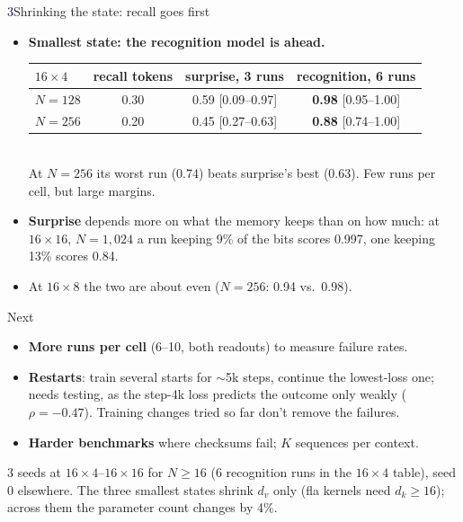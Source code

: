 \documentclass{article}
\renewcommand{\small}{\fontsize{25}{32}\selectfont}
\renewcommand{\footnotesize}{\fontsize{22}{28}\selectfont}
\newcommand{\RC}[1]{\textcolor{recall}{\textbf{#1}}}
\newcommand{\RG}[1]{\textcolor{recog}{\textbf{#1}}}
\begin{document}
\begin{minipage}[t]{15.3in}
\begin{block}[colframe=navy,boxrule=5pt]{\textcolor{navy}{3}\enspace Shrinking the state: recall goes first}
\begin{itemize}
    \item \textbf{Smallest state: the recognition model is ahead.} \\[0.1em]
          {\small\begin{tabular}{@{}lccc@{}}
            $16{\times}4$ & recall tokens & \RC{surprise}, 3 runs & \RG{recognition}, 6 runs \\ \midrule
            $N{=}128$ & 0.30 & 0.59 {\color{ink2}[0.09--0.97]} & \textbf{0.98} {\color{ink2}[0.95--1.00]} \\
            $N{=}256$ & 0.20 & 0.45 {\color{ink2}[0.27--0.63]} & \textbf{0.88} {\color{ink2}[0.74--1.00]} \\
          \end{tabular}}\\[0.15em]
          At $N{=}256$ its worst run (0.74) beats surprise's best (0.63). Few runs per cell, but large margins.
    \item \RC{Surprise} depends more on what the memory keeps than on how much: at $16{\times}16$, $N{=}1{,}024$ a run keeping 9\% of the bits scores 0.997, one keeping 13\% scores 0.84.
    \item At $16{\times}8$ the two are about even ($N{=}256$: 0.94 vs.\ 0.98).
  \end{itemize}
\end{block}

\begin{block}{Next}
  \begin{itemize}
    \item \textbf{More runs per cell} (6--10, both readouts) to measure failure rates.
    \item \textbf{Restarts}: train several starts for ${\sim}$5k steps, continue the lowest-loss one; needs testing, as the step-4k loss predicts the outcome only weakly ($\rho{=}{-}0.47$). Training changes tried so far don't remove the failures.
    \item \textbf{Harder benchmarks} where checksums fail; $K$ sequences per context.
  \end{itemize}
  \vspace{0.1in}
  {\footnotesize\color{ink2} 3 seeds at $16{\times}4$--$16{\times}16$ for $N\ge16$ (6 recognition runs in the $16{\times}4$ table), seed 0 elsewhere. The three smallest states shrink $d_v$ only
   (fla kernels need $d_k\ge16$); across them the parameter count changes by 4\%.\par}
\end{block}\vspace{-0.55in}
\end{minipage}
\end{document}
